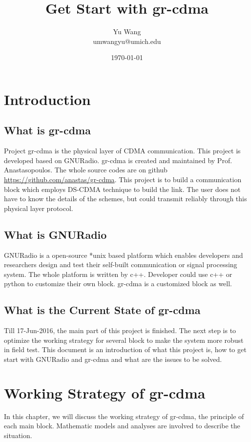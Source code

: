 \documentclass[a4paper]{report}
\title{Get Start with gr-cdma}
\author{Yu Wang\\umwangyu@umich.edu}
\date{\today}
\begin{document}
\maketitle
\tableofcontents
\newpage




% 
\chapter{Introduction}
\section{What is gr-cdma}
Project gr-cdma is the physical layer of CDMA communication. This project is developed based on GNURadio\cite{GNURadio}.
gr-cdma is created and maintained by Prof. Anastasopoulos.
The whole source codes are on github \url{https://github.com/anastas/gr-cdma}.
This project is to build a communication block which employs DS-CDMA technique to build the link.
The user does not have to know the details of the schemes, but could transmit reliably through this physical layer protocol.

\section{What is GNURadio}
GNURadio\cite{GNURadio} is a open-source *unix based platform which enables developers and researchers design and test their self-built communication or signal processing system.
The whole platform is written by c++. Developer could use c++ or python to customize their own block. gr-cdma is a customized block as well.

\section{What is the Current State of gr-cdma}
Till 17-Jun-2016, the main part of this project is finished.
The next step is to optimize the working strategy for several block to make the system more robust in field test. 
This document is an introduction of what this project is, how to get start with GNURadio and gr-cdma and what are the issues to be solved. 



% 
\chapter{Working Strategy of gr-cdma}
In this chapter, we will discuss the working strategy of gr-cdma, the principle of each main block.
Mathematic models and analyses are involved to describe the situation.
\end{document}
